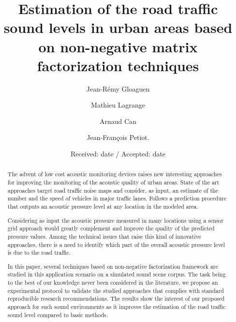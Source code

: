 \documentclass[twocolumn]{svjour3}          %
\begin{document}
\title{Estimation of the road traffic sound levels in urban areas based on non-negative matrix factorization techniques}

\author{Jean-R\'emy Gloaguen         \and
		Mathieu Lagrange \and
		Arnaud Can \and
		Jean-Fran\c cois Petiot.}


\date{Received: date / Accepted: date}


\maketitle

\begin{abstract}
The advent of low cost acoustic monitoring devices raises new interesting approaches for improving the monitoring of the acoustic quality of urban areas. State of the art approaches target road traffic noise maps and consider, as input, an estimate of the number and the speed of vehicles in major traffic lanes. Follows a prediction procedure that outputs an acoustic pressure level at any location in the modeled area.

Considering as input the acoustic pressure measured in many locations using a sensor grid approach would greatly complement and improve the quality of the predicted pressure values. Among the technical issues that raise this kind of innovative approaches, there is a need to identify which part of the overall acoustic pressure level is due to the road traffic.

In this paper, several techniques based on non-negative factorization framework are studied in this application scenario on a simulated sound scene corpus. The task being to the best of our knowledge never been considered in the literature, we propose an experimental protocol to validate the studied approaches that complies with standard reproducible research recommendations. The results show the interest of our proposed approach for such sound environments as it improves the estimation of the road traffic sound level compared to basic methods.

\end{abstract}
\end{document}
